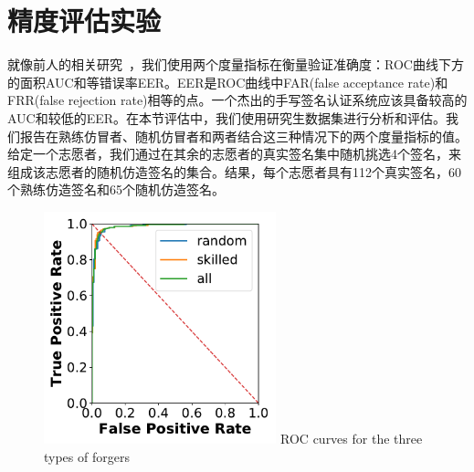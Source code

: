 \section{精度评估实验}
\label{sec:accuracy-experiment}

就像前人的相关研究~\cite{fischer2015robust,levy2018handwritten}，我们使用两个度量指标在衡量验证准确度：ROC曲线下方的面积AUC和等错误率EER。EER是ROC曲线中FAR(false acceptance rate)和FRR(false rejection rate)相等的点。一个杰出的手写签名认证系统应该具备较高的AUC和较低的EER。在本节评估中，我们使用研究生数据集进行分析和评估。我们报告在熟练仿冒者、随机仿冒者和两者结合这三种情况下的两个度量指标的值。给定一个志愿者，我们通过在其余的志愿者的真实签名集中随机挑选4个签名，来组成该志愿者的随机仿造签名的集合。结果，每个志愿者具有112个真实签名，60个熟练仿造签名和65个随机仿造签名。

\begin{figure}
  \centering
  \includegraphics[width=0.6\textwidth]{figure/mimic-random-total-ROC-curves.pdf}
      {ROC curves for the three types of forgers}
  \label{fig:roc-forgers}
\end{figure}

